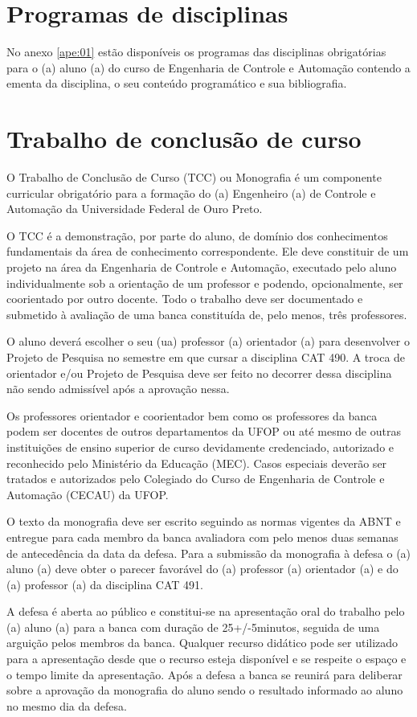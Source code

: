 \section{Programas de disciplinas}
No anexo \ref{ape:01} estão disponíveis os programas das disciplinas obrigatórias para o (a) aluno (a) do curso de Engenharia de Controle e Automação contendo a ementa da disciplina, o seu conteúdo programático e sua bibliografia. 

\section{Trabalho de conclusão de curso}
O Trabalho de Conclusão de Curso (TCC) ou Monografia é um componente curricular obrigatório para a formação do (a) Engenheiro (a) de Controle e Automação da Universidade Federal de Ouro Preto. 

O TCC é a demonstração, por parte do aluno, de domínio dos conhecimentos fundamentais da área de conhecimento correspondente. Ele deve constituir de um projeto na área da Engenharia de Controle e Automação, executado pelo aluno individualmente sob a orientação de um professor e podendo, opcionalmente, ser coorientado por outro docente. Todo o trabalho deve ser documentado e submetido à avaliação de uma banca constituída de, pelo menos, três professores. 

O aluno deverá escolher o seu (ua) professor (a) orientador (a) para desenvolver o Projeto de Pesquisa no semestre em que cursar a disciplina CAT 490. A troca de orientador e/ou Projeto de Pesquisa deve ser feito no decorrer dessa disciplina não sendo admissível após a aprovação nessa.

Os professores orientador e coorientador bem como os professores da banca podem ser docentes de outros departamentos da UFOP ou até mesmo de outras instituições de ensino superior de curso devidamente credenciado, autorizado e reconhecido pelo Ministério da Educação (MEC). Casos especiais deverão ser tratados e autorizados pelo Colegiado do Curso de Engenharia de Controle e Automação (CECAU) da UFOP. 

O texto da monografia deve ser escrito seguindo as normas vigentes da ABNT e entregue para cada membro da banca avaliadora com pelo menos duas semanas de antecedência da data da defesa. Para a submissão da monografia à defesa o (a) aluno (a) deve obter o parecer favorável do (a) professor (a) orientador (a) e do (a) professor (a) da disciplina CAT 491.

A defesa é aberta ao público e constitui-se na apresentação oral do trabalho pelo (a) aluno (a) para a banca com duração de 25+/-5minutos, seguida de uma arguição pelos membros da banca. Qualquer recurso didático pode ser utilizado para a apresentação desde que o recurso esteja disponível e se respeite o espaço e o tempo limite da apresentação. Após a defesa a banca se reunirá para deliberar sobre a aprovação da monografia do aluno sendo o resultado informado ao aluno no mesmo dia da defesa. 

